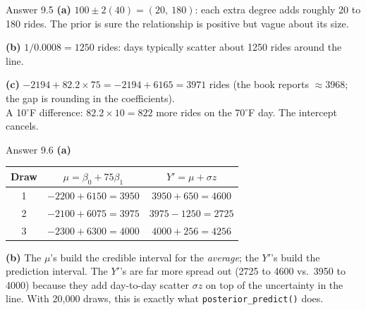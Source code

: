 \documentclass[aspectratio=43,11pt]{beamer}
\begin{document}
\begin{frame}{Answer 9.5}
  \textbf{(a)} $100 \pm 2(40) = (20,\ 180)$: each extra degree adds
  roughly 20 to 180 rides. The prior is sure the relationship is positive
  but vague about its size.
  \vspace{0.4em}

  \textbf{(b)} $1/0.0008 = 1250$ rides: days typically scatter about
  1250 rides around the line.
  \vspace{0.4em}

  \textbf{(c)} $-2194 + 82.2 \times 75 = -2194 + 6165 = 3971$ rides
  (the book reports $\approx 3968$; the gap is rounding in the
  coefficients). \\
  A 10$^\circ$F difference: $82.2 \times 10 = 822$ more rides on the
  70$^\circ$F day. The intercept cancels.
\end{frame}

\begin{frame}{Answer 9.6}
  \textbf{(a)}
  \begin{center}
  \begin{tabular}{@{}ccc@{}}
    \toprule
    Draw & $\mu = \beta_0 + 75\beta_1$ & $Y' = \mu + \sigma z$ \\
    \midrule
    1 & $-2200 + 6150 = 3950$ & $3950 + 650 = 4600$ \\
    2 & $-2100 + 6075 = 3975$ & $3975 - 1250 = 2725$ \\
    3 & $-2300 + 6300 = 4000$ & $4000 + 256 = 4256$ \\
    \bottomrule
  \end{tabular}
  \end{center}
  \textbf{(b)} The $\mu$'s build the credible interval for the
  \emph{average}; the $Y'$'s build the prediction interval. The $Y'$'s
  are far more spread out (2725 to 4600 vs.\ 3950 to 4000) because they
  add day-to-day scatter $\sigma z$ on top of the uncertainty in the line.
  With 20{,}000 draws, this is exactly what \texttt{posterior\_predict()}
  does.
\end{frame}
\end{document}
